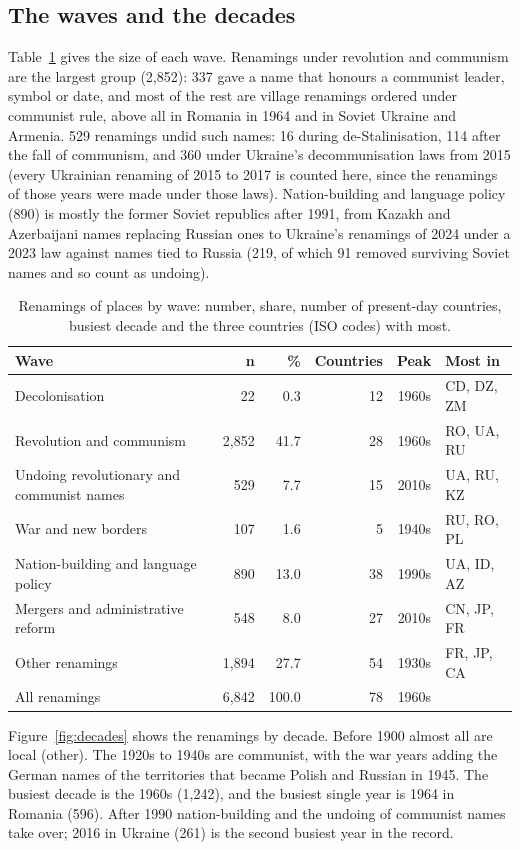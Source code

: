 \documentclass[11pt,a4paper]{article}
\begin{document}
\subsection{The waves and the decades}
Table~\ref{tab:waves} gives the size of each wave. Renamings under revolution and communism are the largest group (2,852): 337 gave a name that honours a communist leader, symbol or date, and most of the rest are village renamings ordered under communist rule, above all in Romania in 1964 and in Soviet Ukraine and Armenia. 529 renamings undid such names: 16 during de-Stalinisation, 114 after the fall of communism, and 360 under Ukraine's decommunisation laws from 2015 (every Ukrainian renaming of 2015 to 2017 is counted here, since the renamings of those years were made under those laws). Nation-building and language policy (890) is mostly the former Soviet republics after 1991, from Kazakh and Azerbaijani names replacing Russian ones to Ukraine's renamings of 2024 under a 2023 law against names tied to Russia (219, of which 91 removed surviving Soviet names and so count as undoing).

\begin{table}[tbp]\centering\small\caption{Renamings of places by wave: number, share, number of present-day countries, busiest decade and the three countries (ISO codes) with most.}\label{tab:waves}\begin{tabular}{lrrrrl}\toprule Wave & n & \% & Countries & Peak & Most in\\\midrule
Decolonisation & 22 & 0.3 & 12 & 1960s & CD, DZ, ZM\\
Revolution and communism & 2,852 & 41.7 & 28 & 1960s & RO, UA, RU\\
Undoing revolutionary and communist names & 529 & 7.7 & 15 & 2010s & UA, RU, KZ\\
War and new borders & 107 & 1.6 & 5 & 1940s & RU, RO, PL\\
Nation-building and language policy & 890 & 13.0 & 38 & 1990s & UA, ID, AZ\\
Mergers and administrative reform & 548 & 8.0 & 27 & 2010s & CN, JP, FR\\
Other renamings & 1,894 & 27.7 & 54 & 1930s & FR, JP, CA\\
\midrule All renamings & 6,842 & 100.0 & 78 & 1960s & \\
\bottomrule\end{tabular}\end{table}

Figure~\ref{fig:decades} shows the renamings by decade. Before 1900 almost all are local (other). The 1920s to 1940s are communist, with the war years adding the German names of the territories that became Polish and Russian in 1945. The busiest decade is the 1960s (1,242), and the busiest single year is 1964 in Romania (596). After 1990 nation-building and the undoing of communist names take over; 2016 in Ukraine (261) is the second busiest year in the record.
\end{document}
